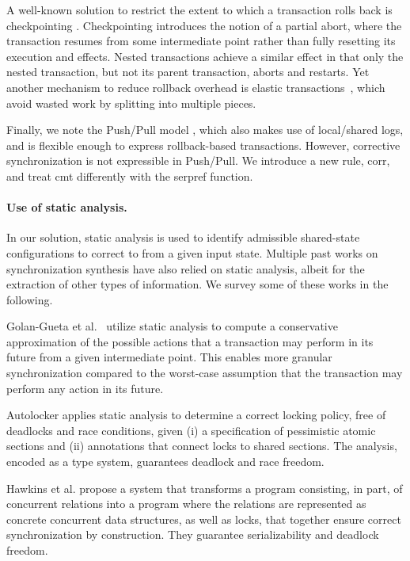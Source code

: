 A well-known solution to restrict the extent to which a transaction rolls back is checkpointing \cite{spaa08a,Egwutuoha:2013}. Checkpointing introduces the notion of a partial abort, where the transaction resumes from some intermediate point rather than fully resetting its execution and effects. Nested transactions \cite{ont,beeri} achieve a similar effect in that only the nested transaction, but not its parent transaction, aborts and restarts. Yet another mechanism to reduce rollback overhead is elastic transactions~\cite{FGG:DISC09}, which avoid wasted work by splitting into multiple pieces.  

Finally, we note the Push/Pull model \cite{KoskinenP15}, which also makes use of local/shared logs, and is flexible enough to express rollback-based transactions. However, corrective synchronization is not expressible in Push/Pull. We introduce a new rule, {\sf corr}, and treat {\sf cmt} differently with the {\sf serpref} function.

\paragraph{Use of static analysis.} In our solution, static analysis is used to identify admissible shared-state configurations to correct to from a given input state. Multiple past works on synchronization synthesis have also relied on static analysis, albeit for the extraction of other types of information. We survey some of these works in the following.

Golan-Gueta et al.~\cite{GRSY:PLDI13} utilize static analysis to compute a conservative approximation of the possible actions that a transaction may perform in its future from a given intermediate point. This enables more granular synchronization compared to the worst-case assumption that the transaction may perform any action in its future.

Autolocker \cite{popl/McCloskeyZGB06} applies static analysis to determine a correct locking policy, free of deadlocks and race conditions, given (i) a specification of pessimistic atomic sections and (ii) annotations that connect locks to shared sections. The analysis, encoded as a type system, guarantees deadlock and race freedom.

Hawkins et al. \cite{HawkinsAFRS12} propose a system that transforms a program consisting, in part, of concurrent relations into a program where the relations are represented as concrete concurrent data structures, as well as locks, that together ensure correct synchronization by construction. They guarantee serializability and deadlock freedom.

